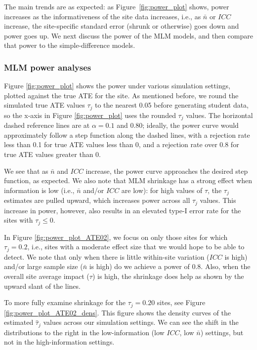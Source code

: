 \documentclass[]{article}
\begin{document}
The main trends are as expected: as Figure~\ref{fig:power_plot} shows, power increases as the informativeness of the site data increases, i.e., as $\bar{n}$ or $ICC$ increase, the site-specific standard error (shrunk or otherwise) goes down and power goes up.
We next discuss the power of the MLM models, and then compare that power to the simple-difference models.


\subsubsection{MLM power analyses}

Figure \ref{fig:power_plot} shows the power under various simulation settings, plotted against the true ATE for the site.
As mentioned before, we round the simulated true ATE values $\tau_j$ to the nearest 0.05 before generating student data, so the x-axis in Figure \ref{fig:power_plot} uses the rounded $\tau_j$ values.
The horizontal dashed reference lines are at $\alpha = 0.1$ and $0.80$; ideally, the power curve would approximately follow a step function along the dashed lines, with a rejection rate less than 0.1 for true ATE values less than 0, and a rejection rate over 0.8 for true ATE values greater than 0.

We see that as $\bar{n}$ and $ICC$ increase, the power curve approaches the desired step function, as expected.
We also note that MLM shrinkage has a strong effect when information is low (i.e., $\bar{n}$ and/or $ICC$ are low): for high values of $\tau$, the $\tau_j$ estimates are pulled upward, which increases power across all $\tau_j$ values.
This increase in power, however, also results in an elevated type-I error rate for the sites with $\tau_j \leq 0$.


In Figure \ref{fig:power_plot_ATE02}, we focus on only those sites for which $\tau_j = 0.2$, i.e., sites with a moderate effect size that we would hope to be able to detect.
We note that only when there is little within-site variation ($ICC$ is high) and/or large sample size ($\bar{n}$ is high) do we achieve a power of 0.8.
Also, when the overall site average impact ($\tau$) is high, the shrinkage does help as shown by the upward slant of the lines.

To more fully examine shrinkage for the $\tau_j = 0.20$ sites, see Figure \ref{fig:power_plot_ATE02_dens}.
This figure shows the density curves of the estimated $\hat{\tau}_j$ values across our simulation settings.
We can see the shift in the distributions to the right in the low-information (low $ICC$, low $\bar{n}$) settings, but not in the high-information settings.
\end{document}
